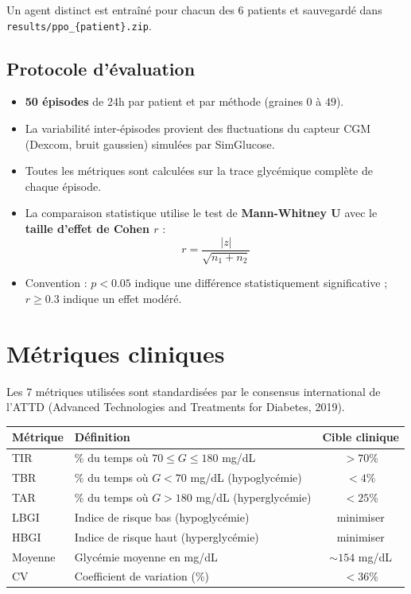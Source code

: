\documentclass[a4paper,12pt]{report}
\begin{document}
Un agent distinct est entraîné pour chacun des 6 patients et sauvegardé dans \texttt{results/ppo\_\{patient\}.zip}.

\section{Protocole d'évaluation}

\begin{itemize}
  \item \textbf{50 épisodes} de 24h par patient et par méthode (graines $0$ à $49$).
  \item La variabilité inter-épisodes provient des fluctuations du capteur CGM (Dexcom, bruit gaussien) simulées par SimGlucose.
  \item Toutes les métriques sont calculées sur la trace glycémique complète de chaque épisode.
  \item La comparaison statistique utilise le test de \textbf{Mann-Whitney U} avec le \textbf{taille d'effet de Cohen $r$} :
  \[
    r = \frac{|z|}{\sqrt{n_1 + n_2}}
  \]
  \item Convention : $p < 0.05$ indique une différence statistiquement significative ; $r \geq 0.3$ indique un effet modéré.
\end{itemize}

\newpage

\chapter{Métriques cliniques}

Les 7 métriques utilisées sont standardisées par le consensus international de l'ATTD (Advanced Technologies and Treatments for Diabetes, 2019).

\begin{center}
\begin{tabularx}{\textwidth}{lXc}
\toprule
\textbf{Métrique} & \textbf{Définition} & \textbf{Cible clinique} \\
\midrule
TIR & \% du temps où $70 \le G \le 180$ mg/dL & $> 70\%$ \\
TBR & \% du temps où $G < 70$ mg/dL (hypoglycémie) & $< 4\%$ \\
TAR & \% du temps où $G > 180$ mg/dL (hyperglycémie) & $< 25\%$ \\
LBGI & Indice de risque bas (hypoglycémie) & minimiser \\
HBGI & Indice de risque haut (hyperglycémie) & minimiser \\
Moyenne & Glycémie moyenne en mg/dL & $\sim 154$ mg/dL \\
CV & Coefficient de variation (\%) & $< 36\%$ \\
\bottomrule
\end{tabularx}
\end{center}
\end{document}
